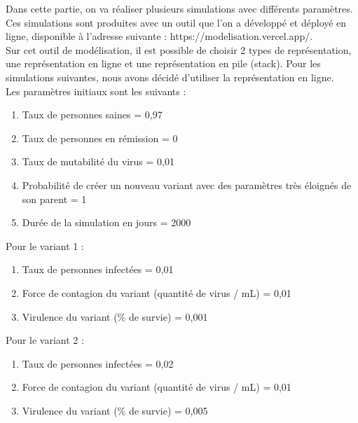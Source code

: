\documentclass{article}
\begin{document}
Dans cette partie, on va réaliser plusieurs simulations avec différents paramètres. Ces simulations sont produites avec un outil que l'on a développé et déployé en ligne, disponible à l'adresse suivante : https://modelisation.vercel.app/. \\
Sur cet outil de modélisation, il est possible de choisir 2 types de représentation, une représentation en ligne et une représentation en pile (stack). Pour les simulations suivantes, nous avons décidé d'utiliser la représentation en ligne. \\
Les paramètres initiaux sont les suivants :
\begin{enumerate}
    \item Taux de personnes saines = 0,97
    \item Taux de personnes en rémission = 0
    \item Taux de mutabilité du virus = 0,01
    \item Probabilité de créer un nouveau variant avec des paramètres très éloignés de son parent = 1
    \item Durée de la simulation en jours = 2000 \\
\end{enumerate}
Pour le variant 1 :
\begin{enumerate}
    \item Taux de personnes infectées = 0,01
    \item Force de contagion du variant (quantité de virus / mL) = 0,01
    \item Virulence du variant (\% de survie) = 0,001\\
\end{enumerate}
Pour le variant 2 :
\begin{enumerate}
    \item Taux de personnes infectées = 0,02
    \item Force de contagion du variant (quantité de virus / mL) = 0,01
    \item Virulence du variant (\% de survie) = 0,005\\
\end{enumerate}
\end{document}
